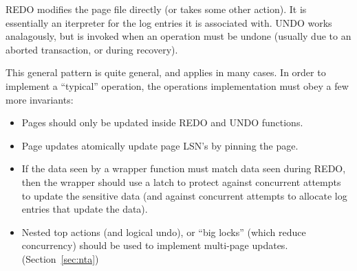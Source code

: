 \documentclass[letterpaper,twocolumn,10pt]{article}
\begin{document}
REDO modifies the page file directly (or takes some other action).  It
is essentially an iterpreter for the log entries it is associated
with.  UNDO works analagously, but is invoked when an operation must
be undone (usually due to an aborted transaction, or during recovery).

This general pattern is quite general, and applies in many cases.  In
order to implement a ``typical'' operation, the operations
implementation must obey a few more invariants:

\begin{itemize}
\item Pages should only be updated inside REDO and UNDO functions.
\item Page updates atomically update page LSN's by pinning the page.
\item If the data seen by a wrapper function must match data seen
  during REDO, then the wrapper should use a latch to protect against
  concurrent attempts to update the sensitive data (and against
  concurrent attempts to allocate log entries that update the data).
\item Nested top actions (and logical undo), or ``big locks'' (which
  reduce concurrency) should be used to implement multi-page updates. (Section~\ref{sec:nta})
\end{itemize}
\end{document}
